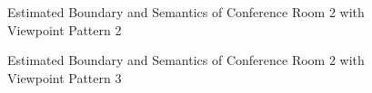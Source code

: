 \documentclass[11pt, a4paper,oneside,chapterprefix=false]{scrbook}
\begin{document}
\vspace{90pt}

\begin{figure}[H]
    \centering
      \label{fig:conf2 b 200 4} \hfill
     \label{fig:conf2 s 200 4}
    \caption{Estimated Boundary and Semantics of Conference Room 2 with Viewpoint Pattern 2}
    \label{fig:conf2 4}
\end{figure}

\begin{figure}[H]
    \centering
      \label{fig:conf2 b 200 5} \hfill
     \label{fig:conf2 s 200 5}
    \caption{Estimated Boundary and Semantics of Conference Room 2 with Viewpoint Pattern 3}
    \label{fig:conf2 5}
\end{figure}
\end{document}
